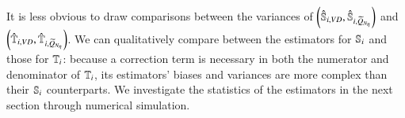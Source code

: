 It is less obvious to draw comparisons between the variances of $\left(\unpollSsalt{i},\pollSsalt{i}\right)$ and $\left(\unpollTsalt{i},\pollTsalt{i}\right)$.
We can qualitatively compare between the estimators for $\S{i}$ and those for $\T{i}$: because a correction term is necessary in both the numerator and denominator of $\T{i}$, its estimators' biases and variances are more complex than their $\S{i}$ counterparts. 
We investigate the statistics of the estimators in the next section through numerical simulation.